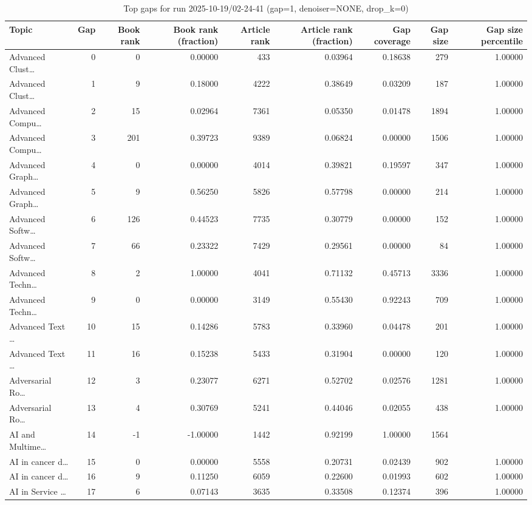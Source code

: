 \begin{table}
\caption{Top gaps for run 2025-10-19/02-24-41 (gap=1, denoiser=NONE, drop\_k=0)}
\label{tab:best_run_gap1_2025_10_19_02_24_41}
\begin{tabular}{lrrrrrrrr}
\toprule
Topic & Gap & Book rank & Book rank (fraction) & Article rank & Article rank (fraction) & Gap coverage & Gap size & Gap size percentile \\
\midrule
Advanced Clust… & 0 & 0 & 0.00000 & 433 & 0.03964 & 0.18638 & 279 & 1.00000 \\
Advanced Clust… & 1 & 9 & 0.18000 & 4222 & 0.38649 & 0.03209 & 187 & 1.00000 \\
Advanced Compu… & 2 & 15 & 0.02964 & 7361 & 0.05350 & 0.01478 & 1894 & 1.00000 \\
Advanced Compu… & 3 & 201 & 0.39723 & 9389 & 0.06824 & 0.00000 & 1506 & 1.00000 \\
Advanced Graph… & 4 & 0 & 0.00000 & 4014 & 0.39821 & 0.19597 & 347 & 1.00000 \\
Advanced Graph… & 5 & 9 & 0.56250 & 5826 & 0.57798 & 0.00000 & 214 & 1.00000 \\
Advanced Softw… & 6 & 126 & 0.44523 & 7735 & 0.30779 & 0.00000 & 152 & 1.00000 \\
Advanced Softw… & 7 & 66 & 0.23322 & 7429 & 0.29561 & 0.00000 & 84 & 1.00000 \\
Advanced Techn… & 8 & 2 & 1.00000 & 4041 & 0.71132 & 0.45713 & 3336 & 1.00000 \\
Advanced Techn… & 9 & 0 & 0.00000 & 3149 & 0.55430 & 0.92243 & 709 & 1.00000 \\
Advanced Text … & 10 & 15 & 0.14286 & 5783 & 0.33960 & 0.04478 & 201 & 1.00000 \\
Advanced Text … & 11 & 16 & 0.15238 & 5433 & 0.31904 & 0.00000 & 120 & 1.00000 \\
Adversarial Ro… & 12 & 3 & 0.23077 & 6271 & 0.52702 & 0.02576 & 1281 & 1.00000 \\
Adversarial Ro… & 13 & 4 & 0.30769 & 5241 & 0.44046 & 0.02055 & 438 & 1.00000 \\
AI and Multime… & 14 & -1 & -1.00000 & 1442 & 0.92199 & 1.00000 & 1564 &  \\
AI in cancer d… & 15 & 0 & 0.00000 & 5558 & 0.20731 & 0.02439 & 902 & 1.00000 \\
AI in cancer d… & 16 & 9 & 0.11250 & 6059 & 0.22600 & 0.01993 & 602 & 1.00000 \\
AI in Service … & 17 & 6 & 0.07143 & 3635 & 0.33508 & 0.12374 & 396 & 1.00000 \\

\end{tabular}
\end{table}
